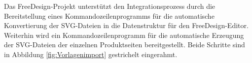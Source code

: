 Das FreeDesign-Projekt unterstützt den Integrationsprozess durch die Bereitstellung eines Kommandozeilenprogramms für die automatische Konvertierung der SVG-Dateien in die Datenstruktur für den FreeDesign-Editor. Weiterhin wird ein Kommandozeilenprogramm für die automatische Erzeugung der SVG-Dateien der einzelnen Produktseiten bereitgestellt. Beide Schritte sind in Abbildung \ref{fig:Vorlagenimport} gestrichelt eingerahmt. 